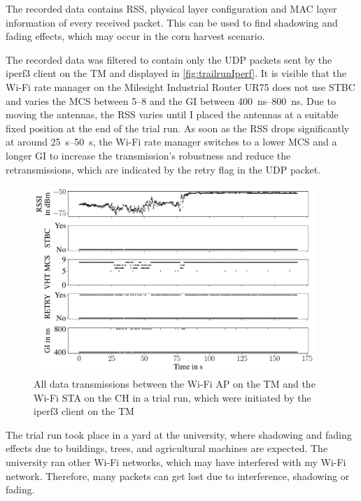 The recorded data contains \ac{RSS}, physical layer configuration and MAC layer information of every received packet.
This can be used to find shadowing and fading effects, which may occur in the corn harvest scenario.

The recorded data was filtered to contain only the \ac{UDP} packets sent by the iperf3 client on the \ac{TM}
and displayed in \autoref{fig:trailrunIperf}.
It is visible that the Wi-Fi rate manager on the Milesight Industrial Router UR75 does not use \ac{STBC} and varies
the \ac{MCS} between \numrange{5}{8} and the \ac{GI} between \SIrange{400}{800}{\nano\second}.
Due to moving the antennas, the \ac{RSS} varies until I placed the antennas at a suitable fixed position at the end of the trial run.
As soon as the \ac{RSS} drops significantly at around \SIrange{25}{50}{\second}, the Wi-Fi rate manager switches to a lower \ac{MCS} and a longer
\ac{GI} to increase the transmission's robustness and reduce the retransmissions, which are indicated by the retry flag in the \ac{UDP} packet.

\begin{figure}[]%
   \centering
   \includegraphics[width=0.95\textwidth]{Latex/figures/wireless5_144}
   \caption{All data transmissions between the Wi-Fi \acf{AP} on the \acf{TM} and the Wi-Fi \ac{STA} on the \acf{CH} in a trial run,
   which were initiated by the iperf3 client on the \acf{TM}}
   \label{fig:trailrunIperf}%
\end{figure}

The trial run took place in a yard at the university, where shadowing and fading effects due to buildings, trees, and agricultural machines are
expected.
The university ran other Wi-Fi networks, which may have interfered with my Wi-Fi network.
Therefore, many packets can get lost due to interference, shadowing or fading.

